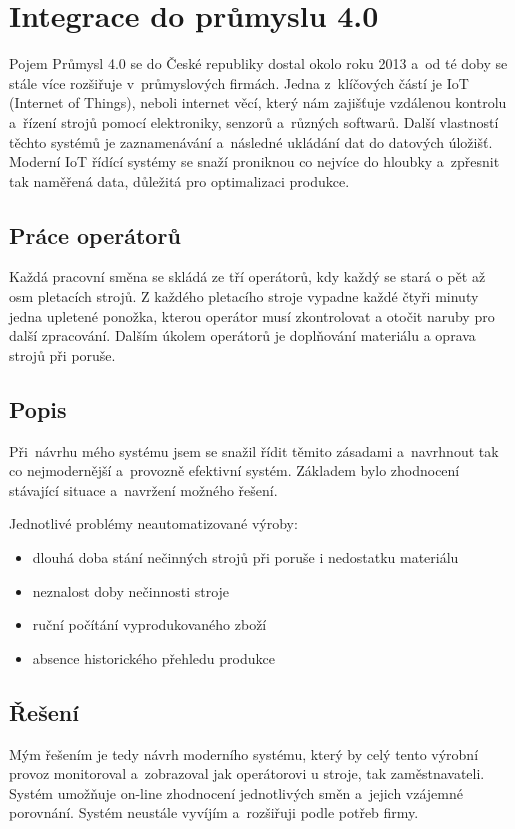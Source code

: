\chapter{Integrace do průmyslu 4.0}
Pojem Průmysl 4.0 se do České republiky dostal okolo roku 2013 a~od té doby se stále více rozšiřuje v~průmyslových firmách.
Jedna z~klíčových částí je IoT (Internet of Things), neboli internet věcí, který nám zajišťuje vzdálenou kontrolu a~řízení strojů pomocí elektroniky, senzorů a~různých softwarů.
Další vlastností těchto systémů je zaznamenávání a~následné ukládání dat do datových úložišť.
Moderní IoT řídící systémy se snaží proniknou co nejvíce do hloubky a~zpřesnit tak naměřená data, důležitá pro optimalizaci produkce.   

\section{Práce operátorů}
Každá pracovní směna se skládá ze tří operátorů, kdy každý se stará o pět až osm pletacích strojů.
Z každého pletacího stroje vypadne každé čtyři minuty jedna upletené ponožka, kterou operátor musí zkontrolovat a otočit naruby pro další zpracování.
Dalším úkolem operátorů je doplňování materiálu a oprava strojů při poruše.

\section{Popis}
Při~návrhu mého systému jsem se snažil řídit těmito zásadami a~navrhnout tak co nejmodernější a~provozně efektivní systém.
Základem bylo zhodnocení stávající situace a~navržení možného řešení.

Jednotlivé problémy neautomatizované výroby:
\begin{itemize}
    \item dlouhá doba stání nečinných strojů při poruše i nedostatku materiálu
    \item neznalost doby nečinnosti stroje
    \item ruční počítání vyprodukovaného zboží
    \item absence historického přehledu produkce
\end{itemize}

\section{Řešení}
Mým řešením je tedy návrh moderního systému, který by celý tento výrobní provoz monitoroval a~zobrazoval jak operátorovi u stroje, tak zaměstnavateli.
Systém umožňuje on-line zhodnocení jednotlivých směn a~jejich vzájemné porovnání.
Systém neustále vyvíjím a~rozšiřuji podle potřeb firmy.

